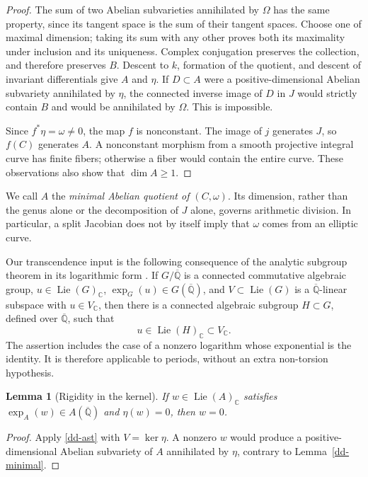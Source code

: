 \documentclass[11pt,a4paper]{article}
\newtheorem{lemma}[theorem]{Lemma}
\theoremstyle{definition}
\theoremstyle{remark}
\numberwithin{equation}{section}
\newcommand{\Qbar}{\overline{\mathbb Q}}
\begin{document}
\begin{proof}
The sum of two Abelian subvarieties annihilated by $\Omega$ has the same
property, since its tangent space is the sum of their tangent spaces.
Choose one of maximal dimension; taking its sum with any other proves
both its maximality under inclusion and its uniqueness.  Complex
conjugation preserves the collection, and therefore preserves $B$.
Descent to $k$, formation of the quotient, and descent of invariant
differentials give $A$ and $\eta$.  If $D\subset A$ were a
positive-dimensional Abelian subvariety annihilated by $\eta$, the
connected inverse image of $D$ in $J$ would strictly contain $B$ and
would be annihilated by $\Omega$.  This is impossible.

Since $f^*\eta=\omega\ne0$, the map $f$ is nonconstant.  The image of
$j$ generates $J$, so $f(C)$ generates $A$.  A nonconstant morphism from
a smooth projective integral curve has finite fibers; otherwise a fiber
would contain the entire curve.  These observations also show that
$\dim A\ge1$.
\end{proof}

We call $A$ the \emph{minimal Abelian quotient of $(C,\omega)$}.  Its
dimension, rather than the genus alone or the decomposition of $J$ alone,
governs arithmetic division.  In particular, a split Jacobian does not
by itself imply that $\omega$ comes from an elliptic curve.

Our transcendence input is the following consequence of the analytic
subgroup theorem in its logarithmic form
\cite[Theorem~6.2]{lm-HuberWustholz}.  If $G/\Qbar$ is a connected
commutative algebraic group, $u\in\operatorname{Lie}(G)_{\mathbb C}$,
$\exp_G(u)\in G(\Qbar)$, and $V\subset\operatorname{Lie}(G)$ is a
$\Qbar$-linear subspace with $u\in V_{\mathbb C}$, then there is a
connected algebraic subgroup $H\subset G$, defined over $\Qbar$, such
that
\begin{equation}\label{dd-ast}
 u\in\operatorname{Lie}(H)_{\mathbb C}\subset V_{\mathbb C}.
\end{equation}
The assertion includes the case of a nonzero logarithm whose exponential
is the identity.  It is therefore applicable to periods, without an
extra non-torsion hypothesis.

\begin{lemma}[Rigidity in the kernel]\label{dd-kernel}
If $w\in\operatorname{Lie}(A)_{\mathbb C}$ satisfies
$\exp_A(w)\in A(\Qbar)$ and $\eta(w)=0$, then $w=0$.
\end{lemma}
\begin{proof}
Apply \eqref{dd-ast} with $V=\ker\eta$.  A nonzero $w$ would produce a
positive-dimensional Abelian subvariety of $A$ annihilated by $\eta$,
contrary to Lemma~\ref{dd-minimal}.
\end{proof}
\end{document}
